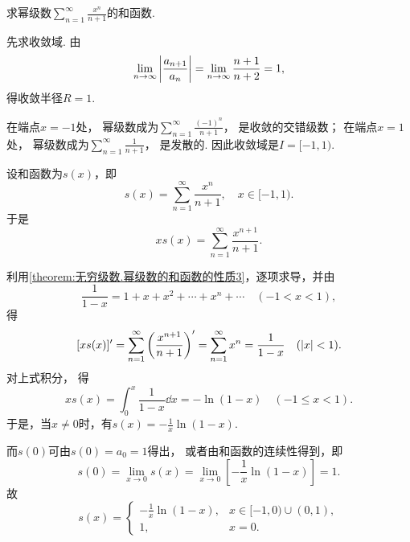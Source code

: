 \begin{example}
求幂级数\(\sum_{n=1}^\infty \frac{x^n}{n+1}\)的和函数.
\begin{solution}
先求收敛域.
由\[
	\lim_{n\to\infty} \abs{\frac{a_{n+1}}{a_n}}
	= \lim_{n\to\infty} \frac{n+1}{n+2}
	= 1,
\]
得收敛半径\(R=1\).

在端点\(x = -1\)处，
幂级数成为\(\sum_{n=1}^\infty \frac{(-1)^n}{n+1}\)，
是收敛的交错级数；
在端点\(x = 1\)处，
幂级数成为\(\sum_{n=1}^\infty \frac{1}{n+1}\)，
是发散的.
因此收敛域是\(I = [-1,1)\).

设和函数为\(s(x)\)，即\[
	s(x) = \sum_{n=1}^\infty \frac{x^n}{n+1},
	\quad x\in[-1,1).
\]
于是\[
	x s(x) = \sum_{n=1}^\infty \frac{x^{n+1}}{n+1}.
\]

利用\cref{theorem:无穷级数.幂级数的和函数的性质3}，逐项求导，并由\[
	\frac{1}{1-x} = 1+x+x^2+\dotsb+x^n+\dotsb
	\quad(-1<x<1),
\]
得\[
	[x s(x)]'
	= \sum_{n=1}^\infty \left( \frac{x^{n+1}}{n+1} \right)'
	= \sum_{n=1}^\infty x^n
	= \frac{1}{1-x}
	\quad(\abs{x}<1).
\]
对上式积分，
得\[
	x s(x) = \int_0^x \frac{1}{1-x} \dd{x} = -\ln(1-x)
	\quad(-1 \leq x < 1).
\]
于是，当\(x\neq0\)时，有\(s(x) = -\frac{1}{x} \ln(1-x)\).

而\(s(0)\)可由\(s(0) = a_0 = 1\)得出，
或者由和函数的连续性得到，即\[
	s(0)
	= \lim_{x\to0} s(x)
	= \lim_{x\to0} \left[ -\frac{1}{x} \ln(1-x) \right]
	= 1.
\]
故\[
	s(x) = \left\{ \begin{array}{cl}
		-\frac{1}{x} \ln(1-x), & x\in[-1,0)\cup(0,1), \\
		1, & x=0.
	\end{array} \right.
\]
\end{solution}
\end{example}
